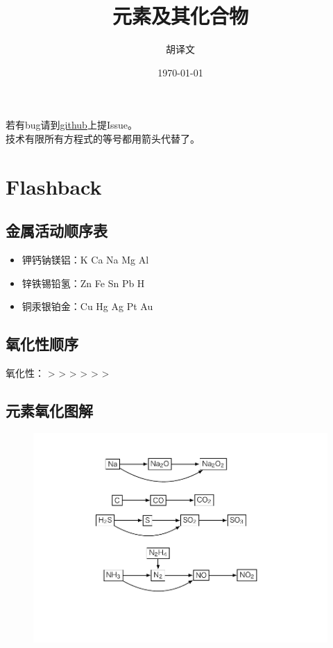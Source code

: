 \documentclass[a4paper]{article}
\title{元素及其化合物}
\author{胡译文}
\date{\today}
\renewcommand\contentsname{目录}
\begin{document}
	\maketitle
	\begin{center}
		若有bug请到{\color{red}\href{https://github.com/huyiwen/Chem}{github}}上提Issue。\\
		技术有限所有方程式的等号都用箭头代替了。
	\end{center}
	\renewcommand\contentsname{目录}
	\tableofcontents
	
	
	\clearpage
	\section*{Flashback}
	\subsection{金属活动顺序表}
	\begin{itemize}
		\item 钾钙钠镁铝：K Ca Na Mg Al
		\item 锌铁锡铅氢：Zn Fe Sn Pb H
		\item 铜汞银铂金：Cu Hg Ag Pt Au
	\end{itemize}
	\subsection{氧化性顺序}
	氧化性： >  >  >  >  >  > 
	\subsection{元素氧化图解}
	\begin{figure}[h]
	\centering
	\includegraphics[scale=0.8]{res/Redox.pdf}
	\end{figure}
	
\end{document}
